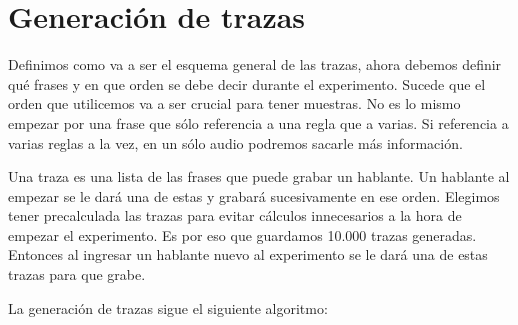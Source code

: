 \section{Generación de trazas}



Definimos como va a ser el esquema general de las trazas, ahora debemos definir qué frases y en que orden se debe decir durante el experimento. Sucede que el orden que utilicemos va a ser crucial para tener muestras. No es lo mismo empezar por una frase que sólo referencia a una regla que a varias. Si referencia a varias reglas a la vez, en un sólo audio podremos sacarle más información.

Una traza es una lista de las frases que puede grabar un hablante. Un hablante al empezar se le dará una de estas y grabará sucesivamente en ese orden. Elegimos tener precalculada las trazas para evitar cálculos innecesarios a la hora de empezar el experimento. Es por eso que guardamos 10.000 trazas generadas. Entonces al ingresar un hablante nuevo al experimento se le dará una de estas trazas para que grabe.

La generación de trazas sigue el siguiente algoritmo:


